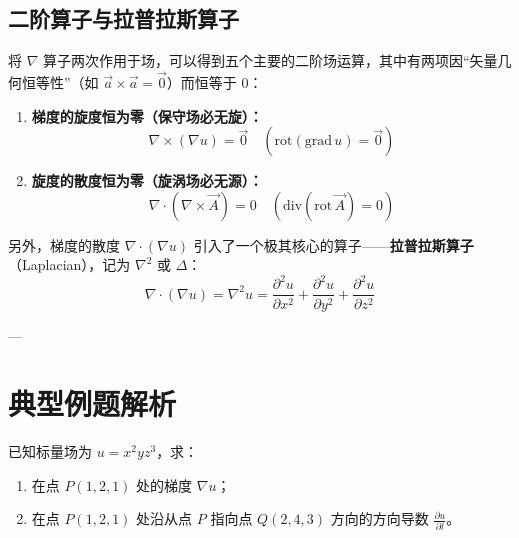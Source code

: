 \subsection{\texorpdfstring{二阶算子与拉普拉斯算子}{二阶算子与拉普拉斯算子}}
将 $\nabla$ 算子两次作用于场，可以得到五个主要的二阶场运算，其中有两项因“矢量几何恒等性”（如 $\vec{a}\times\vec{a}=\vec{0}$）而恒等于 0：
\begin{tcolorbox}[colback=teal!5!white, colframe=teal!75!black, title=定理 \thechapter.4 \quad 二阶核心恒等式]
	\begin{enumerate}
		\item \textbf{梯度的旋度恒为零（保守场必无旋）：}
		$$ \nabla \times (\nabla u) = \vec{0} \quad (\text{rot}(\text{grad}\,u) = \vec{0}) $$
		\item \textbf{旋度的散度恒为零（旋涡场必无源）：}
		$$ \nabla \cdot (\nabla \times \vec{A}) = 0 \quad (\text{div}(\text{rot}\,\vec{A}) = 0) $$
	\end{enumerate}
\end{tcolorbox}

另外，梯度的散度 $\nabla \cdot (\nabla u)$ 引入了一个极其核心的算子——\textbf{拉普拉斯算子}（Laplacian），记为 $\nabla^2$ 或 $\Delta$：
$$ \nabla \cdot (\nabla u) = \nabla^2 u = \frac{\partial^2 u}{\partial x^2} + \frac{\partial^2 u}{\partial y^2} + \frac{\partial^2 u}{\partial z^2} $$

---

\section{典型例题解析}

\begin{tcolorbox}[colback=orange!5!white, colframe=orange!75!black, title=例题 \thechapter.1]
	已知标量场为 $u = x^2 y z^3$，求：
	\begin{enumerate}
		\item 在点 $P(1, 2, 1)$ 处的梯度 $\nabla u$；
		\item 在点 $P(1, 2, 1)$ 处沿从点 $P$ 指向点 $Q(2, 4, 3)$ 方向的方向导数 $\frac{\partial u}{\partial l}$。
	\end{enumerate}
\end{tcolorbox}

